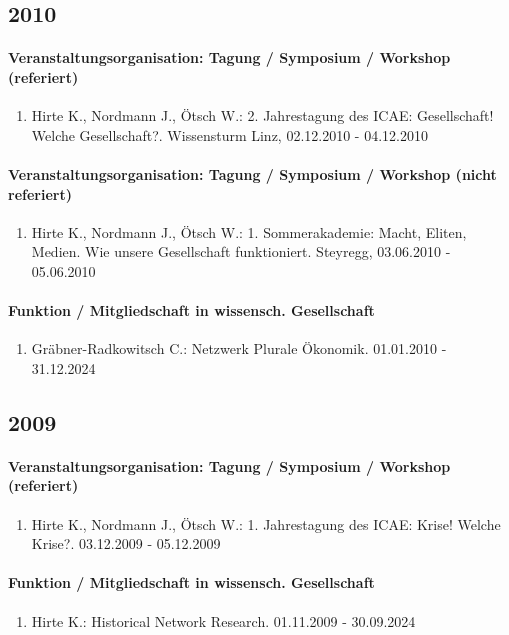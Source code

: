\subsection*{2010} 
\paragraph{Veranstaltungsorganisation: Tagung / Symposium / Workshop (referiert)} 
\begin{enumerate}[leftmargin=*, labelsep=0.5cm] 
 	 \item Hirte K., Nordmann J., Ötsch W.: 2. Jahrestagung des ICAE: Gesellschaft! Welche Gesellschaft?. Wissensturm Linz, 02.12.2010 - 04.12.2010 
\end{enumerate} 
\paragraph{Veranstaltungsorganisation: Tagung / Symposium / Workshop (nicht referiert)} 
\begin{enumerate}[leftmargin=*, labelsep=0.5cm] 
 	 \item Hirte K., Nordmann J., Ötsch W.: 1. Sommerakademie: Macht, Eliten, Medien. Wie unsere Gesellschaft funktioniert. Steyregg, 03.06.2010 - 05.06.2010 
\end{enumerate} 
\paragraph{Funktion / Mitgliedschaft in wissensch. Gesellschaft} 
\begin{enumerate}[leftmargin=*, labelsep=0.5cm] 
 	 \item Gräbner-Radkowitsch C.: Netzwerk Plurale Ökonomik. 01.01.2010 - 31.12.2024 
\end{enumerate} 
\subsection*{2009} 
\paragraph{Veranstaltungsorganisation: Tagung / Symposium / Workshop (referiert)} 
\begin{enumerate}[leftmargin=*, labelsep=0.5cm] 
 	 \item Hirte K., Nordmann J., Ötsch W.: 1. Jahrestagung des ICAE: Krise! Welche Krise?. 03.12.2009 - 05.12.2009 
\end{enumerate} 
\paragraph{Funktion / Mitgliedschaft in wissensch. Gesellschaft} 
\begin{enumerate}[leftmargin=*, labelsep=0.5cm] 
 	 \item Hirte K.: Historical Network Research. 01.11.2009 - 30.09.2024 
\end{enumerate} 
